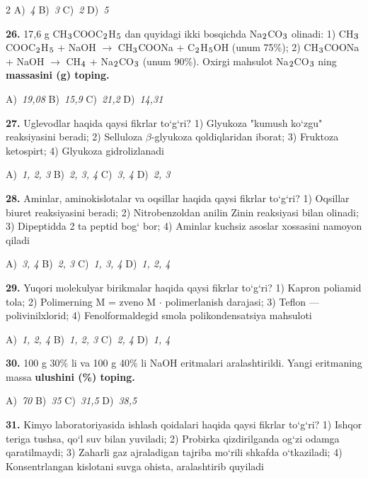 \documentclass[11pt,a4paper]{article}
\renewcommand{\textsubscript}[1]{\ensuremath{_{\text{\fontsize{8}{8}\selectfont #1}}}}
\begin{document}
\begin{multicols}{2}
\noindent A)~\textsl{4} \hfill B)~\textsl{3} \hfill C)~\textsl{2} \hfill D)~\textsl{5}\par
\vspace{4pt}
\noindent\textbf{26.} 17,6 g CH\textsubscript{3}COOC\textsubscript{2}H\textsubscript{5} dan quyidagi ikki bosqichda Na\textsubscript{2}CO\textsubscript{3} olinadi: 1) CH\textsubscript{3}COOC\textsubscript{2}H\textsubscript{5} + NaOH $\to$ CH\textsubscript{3}COONa + C\textsubscript{2}H\textsubscript{5}OH (unum 75\%); 2) CH\textsubscript{3}COONa + NaOH $\to$ CH\textsubscript{4} + Na\textsubscript{2}CO\textsubscript{3} (unum 90\%). Oxirgi mahsulot Na\textsubscript{2}CO\textsubscript{3} ning \textbf{massasini (g) toping.}

\noindent A)~\textsl{19,08} \hfill B)~\textsl{15,9} \hfill C)~\textsl{21,2} \hfill D)~\textsl{14,31}\par
\vspace{4pt}
\noindent\textbf{27.} Uglevodlar haqida qaysi fikrlar to`g`ri? 1) Glyukoza "kumush ko`zgu" reaksiyasini beradi; 2) Selluloza $\beta$-glyukoza qoldiqlaridan iborat; 3) Fruktoza ketospirt; 4) Glyukoza gidrolizlanadi

\noindent A)~\textsl{1, 2, 3} \hfill B)~\textsl{2, 3, 4} \hfill C)~\textsl{3, 4} \hfill D)~\textsl{2, 3}\par
\vspace{4pt}
\noindent\textbf{28.} Aminlar, aminokislotalar va oqsillar haqida qaysi fikrlar to`g`ri? 1) Oqsillar biuret reaksiyasini beradi; 2) Nitrobenzoldan anilin Zinin reaksiyasi bilan olinadi; 3) Dipeptidda 2 ta peptid bog` bor; 4) Aminlar kuchsiz asoslar xossasini namoyon qiladi

\noindent A)~\textsl{3, 4} \hfill B)~\textsl{2, 3} \hfill C)~\textsl{1, 3, 4} \hfill D)~\textsl{1, 2, 4}\par
\vspace{4pt}
\noindent\textbf{29.} Yuqori molekulyar birikmalar haqida qaysi fikrlar to`g`ri? 1) Kapron poliamid tola; 2) Polimerning M = zveno M $\cdot$ polimerlanish darajasi; 3) Teflon --- polivinilxlorid; 4) Fenolformaldegid smola polikondensatsiya mahsuloti

\noindent A)~\textsl{1, 2, 4} \hfill B)~\textsl{1, 2, 3} \hfill C)~\textsl{2, 4} \hfill D)~\textsl{1, 4}\par
\vspace{4pt}
\noindent\textbf{30.} 100 g 30\% li va 100 g 40\% li NaOH eritmalari aralashtirildi. Yangi eritmaning massa \textbf{ulushini (\%) toping.}

\noindent A)~\textsl{70} \hfill B)~\textsl{35} \hfill C)~\textsl{31,5} \hfill D)~\textsl{38,5}\par
\vspace{4pt}
\noindent\textbf{31.} Kimyo laboratoriyasida ishlash qoidalari haqida qaysi fikrlar to`g`ri? 1) Ishqor teriga tushsa, qo`l suv bilan yuviladi; 2) Probirka qizdirilganda og`zi odamga qaratilmaydi; 3) Zaharli gaz ajraladigan tajriba mo`rili shkafda o`tkaziladi; 4) Konsentrlangan kislotani suvga ohista, aralashtirib quyiladi


\end{multicols}
\end{document}
